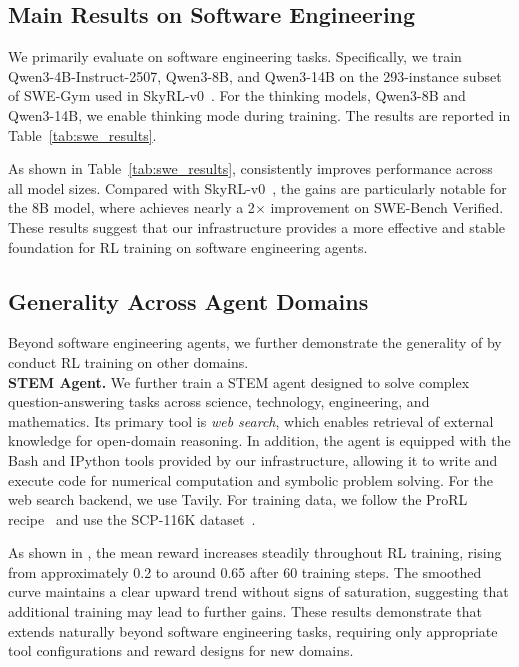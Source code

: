 \subsection{Main Results on Software Engineering}

We primarily evaluate \prorlagent on software engineering tasks. Specifically, we train Qwen3-4B-Instruct-2507, Qwen3-8B, and Qwen3-14B on the 293-instance subset of SWE-Gym used in SkyRL-v0~\citep{cao2025skyrl}. For the thinking models, Qwen3-8B and Qwen3-14B, we enable thinking mode during training. The results are reported in Table~\ref{tab:swe_results}.

As shown in Table~\ref{tab:swe_results}, \prorlagent consistently improves performance across all model sizes. Compared with SkyRL-v0~\citep{cao2025skyrl}, the gains are particularly notable for the 8B model, where \prorlagent achieves nearly a 2$\times$ improvement on SWE-Bench Verified. These results suggest that our infrastructure provides a more effective and stable foundation for RL training on software engineering agents.


\subsection{Generality Across Agent Domains}
Beyond software engineering agents, we further demonstrate the generality of \prorlagent by conduct RL training on other domains. \\
\noindent\textbf{STEM Agent.}
We further train a STEM agent designed to solve complex question-answering tasks across science, technology, engineering, and mathematics. Its primary tool is \emph{web search}, which enables retrieval of external knowledge for open-domain reasoning. In addition, the agent is equipped with the Bash and IPython tools provided by our infrastructure, allowing it to write and execute code for numerical computation and symbolic problem solving.
For the web search backend, we use Tavily. For training data, we follow the ProRL recipe~\citep{prorl2025} and use the SCP-116K dataset~\citep{lu2025scp116khighqualityproblemsolutiondataset}.

As shown in , the mean reward increases steadily throughout RL training, rising from approximately 0.2 to around 0.65 after 60 training steps. The smoothed curve maintains a clear upward trend without signs of saturation, suggesting that additional training may lead to further gains. These results demonstrate that \prorlagent extends naturally beyond software engineering tasks, requiring only appropriate tool configurations and reward designs for new domains.


